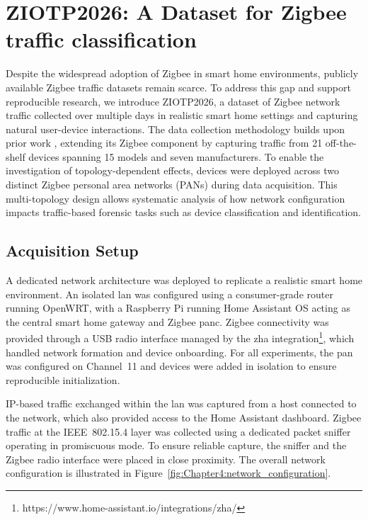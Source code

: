 \section{ZIOTP2026: A Dataset for Zigbee traffic classification}
\label{ZIOTP2026}
Despite the widespread adoption of Zigbee in smart home environments, publicly available Zigbee traffic datasets remain scarce. To address this gap and support reproducible research, we introduce ZIOTP2026, a dataset of Zigbee network traffic collected over multiple days in realistic smart home settings and capturing natural user-device interactions. The data collection methodology builds upon prior work \cite{iot_dataset_paper}, extending its Zigbee component by capturing traffic from 21 off-the-shelf devices spanning 15 models and seven manufacturers.
To enable the investigation of topology-dependent effects, devices were deployed across two distinct Zigbee personal area networks (PANs) during data acquisition. This multi-topology design allows systematic analysis of how network configuration impacts traffic-based forensic tasks such as device classification and identification.


\subsection{Acquisition Setup}
\label{Data_acquisition_Setup}
A dedicated network architecture was deployed to replicate a realistic smart home environment. An isolated \gls*{lan} was configured using a consumer-grade router running OpenWRT, with a Raspberry Pi running Home Assistant OS \cite{home_assistant_os} acting as the central smart home gateway and Zigbee \gls*{panc}. Zigbee connectivity was provided through a USB radio interface managed by the \gls*{zha} integration\footnote{https://www.home-assistant.io/integrations/zha/}, which handled network formation and device onboarding. For all experiments, the \gls*{pan} was configured on Channel~11 and devices were added in isolation to ensure reproducible initialization.

IP-based traffic exchanged within the \gls*{lan} was captured from a host connected to the network, which also provided access to the Home Assistant dashboard. Zigbee traffic at the IEEE~802.15.4 layer was collected using a dedicated packet sniffer operating in promiscuous mode. To ensure reliable capture, the sniffer and the Zigbee radio interface were placed in close proximity. The overall network configuration is illustrated in Figure~\ref{fig:Chapter4:network_configuration}.


